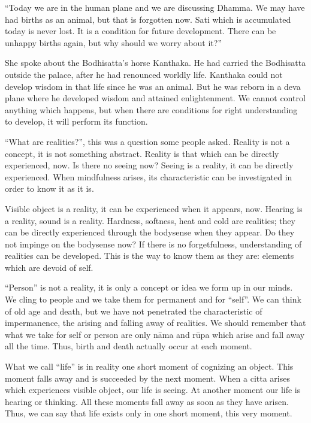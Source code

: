 ``Today we are in the human plane and we are discussing Dhamma. We may
have had births as an animal, but that is forgotten now. Sati which is
accumulated today is never lost. It is a condition for future
development. There can be unhappy births again, but why should we worry
about it?''

She spoke about the Bodhisatta's horse Kanthaka. He had carried the
Bodhisatta outside the palace, after he had renounced worldly life.
Kanthaka could not develop wisdom in that life since he was an animal.
But he was reborn in a deva plane where he developed wisdom and attained
enlightenment. We cannot control anything which happens, but when there
are conditions for right understanding to develop, it will perform its
function.

``What are realities?'', this was a question some people asked. Reality
is not a concept, it is not something abstract. Reality is that which
can be directly experienced, now. Is there no seeing now? Seeing is a
reality, it can be directly experienced. When mindfulness arises, its
characteristic can be investigated in order to know it as it is.

Visible object is a reality, it can be experienced when it appears, now.
Hearing is a reality, sound is a reality. Hardness, softness, heat and
cold are realities; they can be directly experienced through the
bodysense when they appear. Do they not impinge on the bodysense now? If
there is no forgetfulness, understanding of realities can be developed.
This is the way to know them as they are: elements which are devoid of
self.

``Person'' is not a reality, it is only a concept or idea we form up in
our minds. We cling to people and we take them for permanent and for
``self''. We can think of old age and death, but we have not penetrated
the characteristic of impermanence, the arising and falling away of
realities. We should remember that what we take for self or person are
only nāma and rūpa which arise and fall away all the time. Thus, birth
and death actually occur at each moment.

What we call ``life'' is in reality one short moment of cognizing an
object. This moment falls away and is succeeded by the next moment. When
a citta arises which experiences visible object, our life is seeing. At
another moment our life is hearing or thinking. All these moments fall
away as soon as they have arisen. Thus, we can say that life exists only
in one short moment, this very moment.

